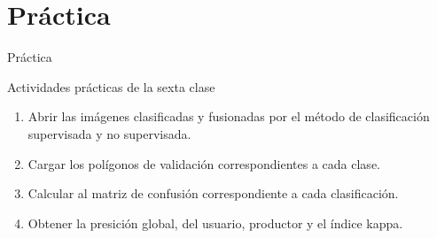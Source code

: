 \documentclass[handout]{beamer}
\begin{document}
\section{Práctica}

\begin{frame}{Práctica}
  \begin{exampleblock}{Actividades prácticas de la sexta clase}
    \begin{enumerate}
      \item Abrir las imágenes clasificadas y fusionadas por el método de clasificación supervisada y no supervisada.
      \item Cargar los polígonos de validación correspondientes a cada clase.
      \item Calcular al matriz de confusión correspondiente a cada clasificación.
      \item Obtener la presición global, del usuario, productor y el índice kappa.
    \end{enumerate}
  \end{exampleblock}
\end{frame}
\end{document}
